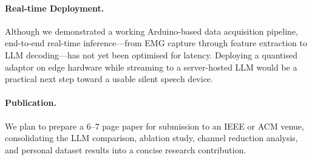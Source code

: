 \paragraph{Real-time Deployment.} Although we demonstrated a working Arduino-based data acquisition pipeline, end-to-end real-time inference---from EMG capture through feature extraction to LLM decoding---has not yet been optimised for latency. Deploying a quantised adaptor on edge hardware while streaming to a server-hosted LLM would be a practical next step toward a usable silent speech device.

\paragraph{Publication.} We plan to prepare a 6--7 page paper for submission to an IEEE or ACM venue, consolidating the LLM comparison, ablation study, channel reduction analysis, and personal dataset results into a concise research contribution.
